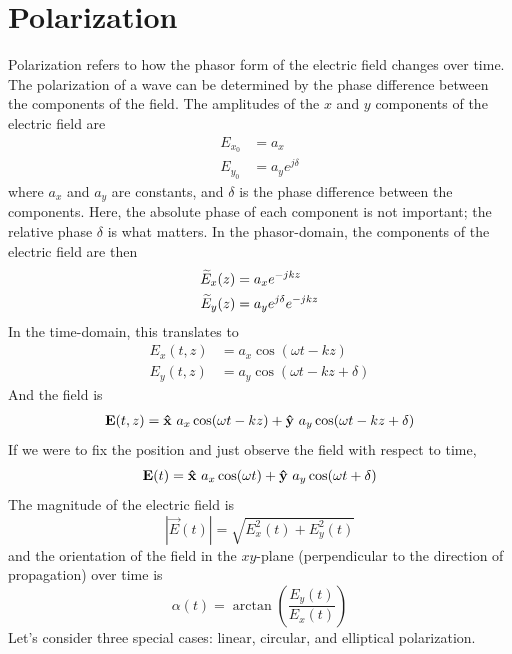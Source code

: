 \section{Polarization}
Polarization refers to how the phasor form of the electric field changes over time. The polarization of a wave can be determined by the phase difference between the components of the field. The amplitudes of the $x$ and $y$ components of the electric field are %
\begin{subequations} %
\begin{align}
    E_{x_0} &= a_x \\ 
    E_{y_0} &= a_y e^{j\delta}
\end{align}
\end{subequations}
where $a_x$ and $a_y$ are constants, and $\delta$ is the phase difference between the components. Here, the absolute phase of each component is not important; the relative phase $\delta$ is what matters. In the phasor-domain, the components of the electric field are then 
\begin{align}
    \widetilde{E}_x(z) &= a_x e^{-jkz} \\ 
    \widetilde{E}_y(z) &= a_y e^{j\delta} e^{-jkz}
\end{align}
In the time-domain, this translates to 
\begin{align}
    E_x(t,z) &= a_x \cos(\omega t - kz) \\
    E_y(t,z) &= a_y \cos(\omega t - kz + \delta) 
\end{align}
And the field is 
\begin{align}
    \boldsymbol{\mathrm{E}}(t,z) = \boldsymbol{{\mathrm{\hat{x}}}} \ a_x \cos(\omega t - kz) + \boldsymbol{{\mathrm{\hat{y}}}}\ a_y \cos(\omega t - kz + \delta) 
\end{align}
If we were to fix the position and just observe the field with respect to time, 
\begin{equation}
    \boldsymbol{\mathrm{E}}(t) = \boldsymbol{{\mathrm{\hat{x}}}}\ a_x \cos(\omega t) + \boldsymbol{{\mathrm{\hat{y}}}}\ a_y \cos(\omega t + \delta) 
\end{equation}
The magnitude of the electric field is 
\begin{equation}
    |\vec{E}(t)| = \sqrt{E_x^2(t) + E_y^2(t)}
\end{equation}
and the orientation of the field in the $xy$-plane (perpendicular to the direction of propagation) over time is 
\begin{equation}
    \alpha(t) = \arctan\left(\dfrac{E_y(t)}{E_x(t)} \right)
\end{equation}
Let's consider three special cases: linear, circular, and elliptical polarization. 

